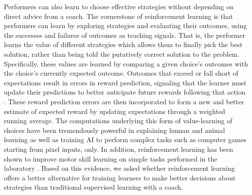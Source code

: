 \documentclass[pdflatex,sn-nature]{sn-jnl}%
\theoremstyle{thmstyleone}%
\theoremstyle{thmstyletwo}%
\theoremstyle{thmstylethree}%
\begin{document}
Performers can also learn to choose effective strategies without depending on direct advice from a coach. The cornerstone of reinforcement learning \cite{sutton_reinforcement_2018} is that performers can learn by exploring strategies and evaluating their outcomes, using the successes and failures of outcomes as teaching signals. That is, the performer learns the value of different strategies which allows them to finally pick the best solution, rather than being told the putatively correct solution to the problem. Specifically, these values are learned by comparing a given choice's outcomes with the choice's currently expected outcome. Outcomes that exceed or fall short of expectations result in errors in reward prediction, signaling that the learner must update their predictions to better anticipate future rewards following that action \cite{rescorla_theory_1972}. These reward prediction errors are then incorporated to form a new and better estimate of expected reward by updating expectations through a weighted running average. The computations underlying this form of value-learning of choices have been tremendously powerful in explaining human and animal learning \cite{waelti_dopamine_2001, schultz_neural_1997, pessiglione_dopamine-dependent_2006,lee_neural_2012, law_reinforcement_2009} as well as training AI to perform complex tasks such as computer games starting from pixel inputs, only\cite{mnih_human-level_2015}. In addition, reinforcement learning has been shown to improve motor skill learning on simple tasks performed in the laboratory \cite{lior_shmuelof_overcoming_2012, abe_reward_2011, truong_error-based_2023, hasson_reinforcement_2015}. Based on this evidence, we asked whether reinforcement learning offers a better alternative for training learners to make better decisions about strategies than traditional supervised learning with a coach. 
\end{document}
